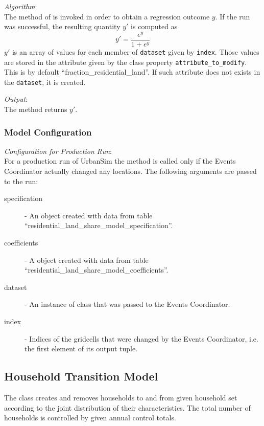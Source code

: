 {\it Algorithm}:\\[1mm]
The  method of  is invoked in order to
obtain a regression outcome $y$. If the run
was successful, the resulting quantity $y'$ is computed as
\[
y' = \frac{e^y}{1+e^y}
\]
$y'$ is an array of values for each member of \verb|dataset| given by
\verb|index|. Those values are stored in the attribute given by the class
property \verb|attribute_to_modify|. This is by default
``fraction_residential_land''. If such attribute does not exists in the
\verb|dataset|, it is created.

{\it Output}:\\[1mm]
The method returns $y'$.

\subsubsection{Model Configuration}
\modelsindex
%
{\em Configuration for Production Run}:\\[1mm]
For a production run of UrbanSim the method  is called only if
the Events Coordinator actually changed any locations.  The following
arguments are passed to the run:
\begin{description}
\item[specification] -  An
 object created with data from table
``residential_land_share_model_specification''. 
\item[coefficients] - A  object created
with data from table ``residential_land_share_model_coefficients''.\modelsindex
\item[dataset] - An instance of class  that was passed to
  the Events Coordinator.
\item[index] - Indices of the gridcells that were changed by the Events
  Coordinator, i.e. the first element of its output tuple.
\end{description}

%
\subsection{Household Transition Model}
\modelsindex
%
\label{sec:household-transition-model}
 The class  
creates and removes households to and from given household set according to
the joint distribution of their characteristics. The total number of
households is controlled by given annual control totals.

